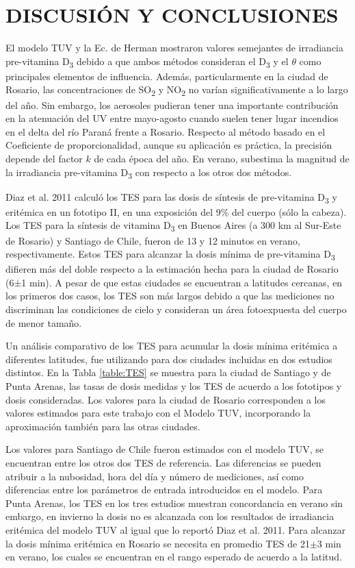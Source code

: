 \documentclass[10pt,twocolumn]{article}
\begin{document}
\section{DISCUSIÓN Y CONCLUSIONES}
El modelo TUV y la Ec. de Herman mostraron valores semejantes de irradiancia pre-vitamina D\textsubscript{3} debido a que ambos métodos consideran el D\textsubscript{3} y el $\theta$ como principales elementos de influencia. Además, particularmente en la ciudad de Rosario, las concentraciones de SO\textsubscript{2} y NO\textsubscript{2} no varían significativamente a lo largo del año. Sin embargo, los aerosoles pudieran tener una importante contribución en la atenuación del UV entre mayo-agosto cuando suelen tener lugar incendios en el delta del río Paraná frente a Rosario.\cite{Madronich1987} Respecto al método basado en el Coeficiente de proporcionalidad, aunque su aplicación es práctica, la precisión depende del factor $k$ de cada época del año. En verano, subestima la magnitud de la irradiancia pre-vitamina D\textsubscript{3} con respecto a los otros dos métodos.

Diaz et al. 2011 calculó los TES para las dosis de síntesis de pre-vitamina D\textsubscript{3} y eritémica en un fototipo II, en una exposición del 9\% del cuerpo (sólo la cabeza). Los TES para la síntesis de vitamina D\textsubscript{3} en Buenos Aires (a 300 km al Sur-Este de Rosario) y Santiago de Chile, fueron de 13 y 12 minutos en verano, respectivamente.\cite{IPINA2012966} Estos TES para alcanzar la dosis mínima de pre-vitamina D\textsubscript{3} difieren más del doble respecto a la estimación hecha para la ciudad de Rosario (6±1 min). A pesar de que estas ciudades se encuentran a latitudes cercanas, en los primeros dos casos, los TES son más largos debido a que las mediciones no discriminan las condiciones de cielo y consideran un área fotoexpuesta del cuerpo de menor tamaño.

Un análisis comparativo de los TES para acumular la dosis mínima eritémica a diferentes latitudes, fue utilizando para dos ciudades incluidas en dos estudios distintos.\cite{Diaz2011,cabrera_radiacion_2005}  En la Tabla \ref{table:TES} se muestra para la ciudad de Santiago y de Punta Arenas, las tasas de dosis medidas y los TES de acuerdo a los fototipos y dosis consideradas. Los valores para la ciudad de Rosario corresponden a los valores estimados para este trabajo con el Modelo TUV, incorporando la aproximación también para las otras ciudades.

Los valores para Santiago de Chile fueron estimados con el modelo TUV, se encuentran entre los otros dos TES de referencia. Las diferencias se pueden atribuir a la nubosidad, hora del día y número de mediciones, así como diferencias entre los parámetros de entrada introducidos en el modelo. Para Punta Arenas, los TES en los tres estudios muestran concordancia en verano sin embargo, en invierno la dosis no es alcanzada con los resultados de irradiancia eritémica del modelo TUV al igual que lo reportó Diaz et al. 2011. Para alcanzar la dosis mínima eritémica en Rosario se necesita en promedio TES de 21$\pm$3 min en verano, los cuales se encuentran en el rango esperado de acuerdo a la latitud.
\end{document}
